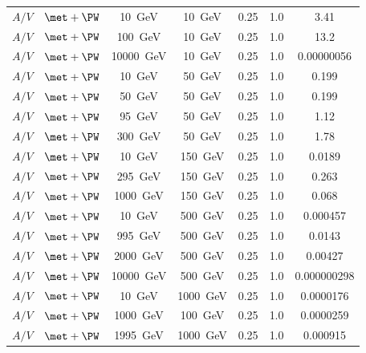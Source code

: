 \begin{table}[htb]
\begin{tabular}{ccccccc}
\(A/V\) & \(\met + \PW\) & \SI{10}{\giga\electronvolt} & \SI{10}{\giga\electronvolt} & 0.25 & 1.0 & 3.41 \\
\(A/V\) & \(\met + \PW\) & \SI{100}{\giga\electronvolt} & \SI{10}{\giga\electronvolt} & 0.25 & 1.0 & 13.2 \\
\(A/V\) & \(\met + \PW\) & \SI{10000}{\giga\electronvolt} & \SI{10}{\giga\electronvolt} & 0.25 & 1.0 & 0.00000056 \\
\(A/V\) & \(\met + \PW\) & \SI{10}{\giga\electronvolt} & \SI{50}{\giga\electronvolt} & 0.25 & 1.0 & 0.199 \\
\(A/V\) & \(\met + \PW\) & \SI{50}{\giga\electronvolt} & \SI{50}{\giga\electronvolt} & 0.25 & 1.0 & 0.199 \\
\(A/V\) & \(\met + \PW\) & \SI{95}{\giga\electronvolt} & \SI{50}{\giga\electronvolt} & 0.25 & 1.0 & 1.12 \\
\(A/V\) & \(\met + \PW\) & \SI{300}{\giga\electronvolt} & \SI{50}{\giga\electronvolt} & 0.25 & 1.0 & 1.78 \\
\(A/V\) & \(\met + \PW\) & \SI{10}{\giga\electronvolt} & \SI{150}{\giga\electronvolt} & 0.25 & 1.0 & 0.0189 \\
\(A/V\) & \(\met + \PW\) & \SI{295}{\giga\electronvolt} & \SI{150}{\giga\electronvolt} & 0.25 & 1.0 & 0.263 \\
\(A/V\) & \(\met + \PW\) & \SI{1000}{\giga\electronvolt} & \SI{150}{\giga\electronvolt} & 0.25 & 1.0 & 0.068 \\
\(A/V\) & \(\met + \PW\) & \SI{10}{\giga\electronvolt} & \SI{500}{\giga\electronvolt} & 0.25 & 1.0 & 0.000457 \\
\(A/V\) & \(\met + \PW\) & \SI{995}{\giga\electronvolt} & \SI{500}{\giga\electronvolt} & 0.25 & 1.0 & 0.0143 \\
\(A/V\) & \(\met + \PW\) & \SI{2000}{\giga\electronvolt} & \SI{500}{\giga\electronvolt} & 0.25 & 1.0 & 0.00427 \\
\(A/V\) & \(\met + \PW\) & \SI{10000}{\giga\electronvolt} & \SI{500}{\giga\electronvolt} & 0.25 & 1.0 & 0.000000298 \\
\(A/V\) & \(\met + \PW\) & \SI{10}{\giga\electronvolt} & \SI{1000}{\giga\electronvolt} & 0.25 & 1.0 & 0.0000176 \\
\(A/V\) & \(\met + \PW\) & \SI{1000}{\giga\electronvolt} & \SI{100}{\giga\electronvolt} & 0.25 & 1.0 & 0.0000259 \\
\(A/V\) & \(\met + \PW\) & \SI{1995}{\giga\electronvolt} & \SI{1000}{\giga\electronvolt} & 0.25 & 1.0 & 0.000915 \\
\bottomrule
\end{tabular}
\end{table}

